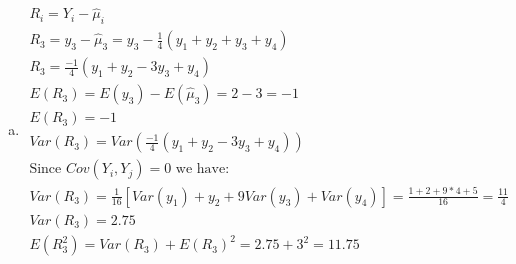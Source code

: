 \documentclass{article}
\newcommand{\hu}{\hat{\mu}}
\begin{document}
\begin{flushleft}
\begin{enumerate}[(a)]
\item 
\begin{multline*}\\
R_i=Y_i-\hu_i\\
R_3=y_3-\hu_3=y_3-\frac{1}{4}(y_1+y_2+y_3+y_4)\\
R_3=\frac{-1}{4}(y_1+y_2-3y_3+y_4)\\
E(R_3)=E(y_3)-E(\hu_3)=2-3=-1\\
E(R_3)=-1\\
Var(R_3)=Var\left(\frac{-1}{4}(y_1+y_2-3y_3+y_4)\right)\\
\text{Since } Cov(Y_i,Y_j)=0 \text{ we have:}\\
Var(R_3)=\frac{1}{16}[Var(y_1)+y_2+9Var(y_3)+Var(y_4)]=\frac{1+2+9*4+5}{16}=\frac{11}{4}\\
Var(R_3)=2.75\\
E(R^2_3)=Var(R_3)+E(R_3)^2=2.75+3^2=11.75\\
\end{multline*}


\end{enumerate}


\end{flushleft}
\end{document}

